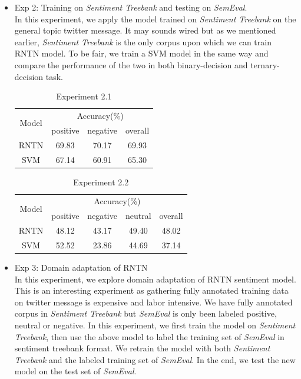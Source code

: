 \begin{itemize}
\item Exp 2: Training on \textit{Sentiment Treebank} and testing on \textit{SemEval}. \\ 
In this experiment, we apply the model trained on \textit{Sentiment Treebank} on the general topic twitter message. It may sounds wired but as we mentioned earlier, \textit{Sentiment Treebank} is the only corpus upon which we can train RNTN model. To be fair, we train a SVM model in the same way and compare the performance of the two in both binary-decision and ternary-decision task. 
\begin{table}[H]
  \begin{center}
    \begin{tabular}{cccc}\hline
      \multirow{2}{*}{Model} 
      & \multicolumn{3}{c}{Accuracy(\%)} \\\cline{2-4}
    & positive & negative & overall \\ \hline
    RNTN  & 69.83     &   70.17	    &   69.93    \\ 
    SVM   & 67.14     &   60.91     &   65.30      \\ \hline
    \end{tabular}
    \end{center}
    \caption{\label{exp5_2_1} Experiment 2.1}
\end{table}

\begin{table}[H]
  \begin{center}
    \begin{tabular}{ccccc}\hline
      \multirow{2}{*}{Model} 
      & \multicolumn{4}{c}{Accuracy(\%)} \\\cline{2-5}
    & positive & negative & neutral & overall \\ \hline
    RNTN  & 48.12    &   43.17  	   &   49.40       & 48.02    \\ 
    SVM   & 52.52    &   23.86     &   44.69       & 37.14    \\ \hline
    \end{tabular}
    \end{center}
    \caption{\label{exp5_2_2} Experiment 2.2}
\end{table}


\item Exp 3: Domain adaptation of RNTN\\
In this experiment, we explore domain adaptation of RNTN sentiment model. This is an interesting experiment as gathering fully annotated training data on twitter message is expensive and labor intensive. We have fully annotated corpus in \textit{Sentiment Treebank} but \textit{SemEval} is only been labeled positive, neutral or negative. In this experiment, we first train the model on \textit{Sentiment Treebank}, then use the above model to label the training set of \textit{SemEval} in sentiment treebank format. We retrain the model with both \textit{Sentiment Treebank} and the labeled  training set of \textit{SemEval}. In the end, we test the new model on the test set of \textit{SemEval}.



\end{itemize}
